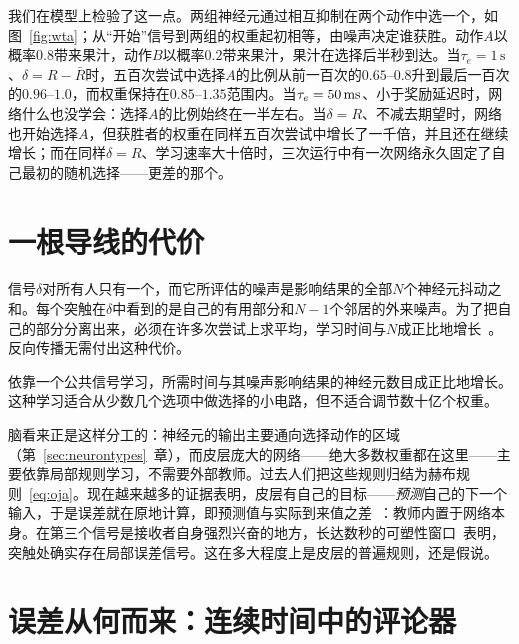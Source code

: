 我们在模型上检验了这一点。两组神经元通过相互抑制在两个动作中选一个，如图~\ref{fig:wta}；从“开始”信号到两组的权重起初相等，由噪声决定谁获胜。动作$A$以概率$0.8$带来果汁，动作$B$以概率$0.2$带来果汁，果汁在选择后半秒到达。当$\tau_e=1\,\text{s}$、$\delta=R-\bar R$时，五百次尝试中选择$A$的比例从前一百次的$0.65$--$0.8$升到最后一百次的$0.96$--$1.0$，而权重保持在$0.85$--$1.35$范围内。当$\tau_e=50\,\text{ms}$、小于奖励延迟时，网络什么也没学会：选择$A$的比例始终在一半左右。当$\delta=R$、不减去期望时，网络也开始选择$A$，但获胜者的权重在同样五百次尝试中增长了一千倍，并且还在继续增长；而在同样$\delta=R$、学习速率大十倍时，三次运行中有一次网络永久固定了自己最初的随机选择——更差的那个。

\section{一根导线的代价}

信号$\delta$对所有人只有一个，而它所评估的噪声是影响结果的全部$N$个神经元抖动之和。每个突触在$\delta$中看到的是自己的有用部分和$N-1$个邻居的外来噪声。为了把自己的部分分离出来，必须在许多次尝试上求平均，学习时间与$N$成正比地增长~\cite{Werfel2005}。反向传播无需付出这种代价。

\begin{keyblock}
\begin{proposition}[广播的代价]
\label{prop:broadcastcost}
依靠一个公共信号学习，所需时间与其噪声影响结果的神经元数目成正比地增长。这种学习适合从少数几个选项中做选择的小电路，但不适合调节数十亿个权重。
\end{proposition}
\end{keyblock}

脑看来正是这样分工的：神经元的输出主要通向选择动作的区域（第~\ref{sec:neurontypes}~章），而皮层庞大的网络——绝大多数权重都在这里——主要依靠局部规则学习，不需要外部教师。过去人们把这些规则归结为赫布规则~\eqref{eq:oja}。现在越来越多的证据表明，皮层有自己的目标——\emph{预测}自己的下一个输入，于是误差就在原地计算，即预测值与实际到来值之差~\cite{Keller2018}：教师内置于网络本身。在第三个信号是接收者自身强烈兴奋的地方，长达数秒的可塑性窗口~\cite{Bittner2017}表明，突触处确实存在局部误差信号。这在多大程度上是皮层的普遍规则，还是假说。

\section{误差从何而来：连续时间中的评论器}

